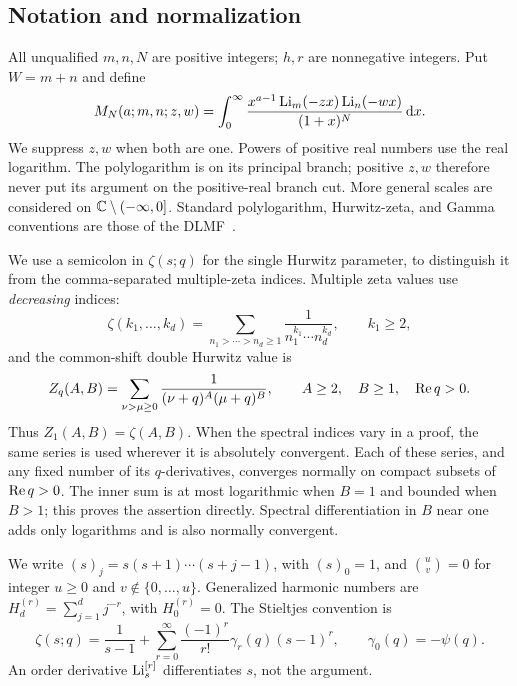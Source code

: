 \subsection{Notation and normalization}
All unqualified $m,n,N$ are positive integers; $h,r$ are nonnegative
integers. Put $W=m+n$ and define
\begin{equation}\label{bmh:eq:M-definition}
 M_N(a;m,n;z,w)=\int_0^\infty
 \frac{x^{a-1}\operatorname{Li}_m(-zx)\operatorname{Li}_n(-wx)}{(1+x)^N}\,\mathrm d x.
\end{equation}
We suppress $z,w$ when both are one. Powers of positive real numbers use
the real logarithm. The polylogarithm is on its principal branch; positive
$z,w$ therefore never put its argument on the positive-real branch cut.
More general scales are considered on
$\mathbb C\setminus(-\infty,0]$. Standard polylogarithm, Hurwitz-zeta, and Gamma
conventions are those of the DLMF~\cite{DLMFpoly,DLMFhurwitz,DLMFbeta}.

We use a semicolon in $\zeta(s;q)$ for the single Hurwitz parameter,
to distinguish it from the comma-separated multiple-zeta indices.
Multiple zeta values use \emph{decreasing} indices:
\begin{equation}\label{bmh:eq:MZV}
 \zeta(k_1,\ldots,k_d)=
 \sum_{n_1>\cdots>n_d\ge1}\frac1{n_1^{k_1}\cdots n_d^{k_d}},
 \qquad k_1\ge2,
\end{equation}
and the common-shift double Hurwitz value is
\begin{equation}\label{bmh:eq:Zq}
 Z_q(A,B)=\sum_{\nu>\mu\ge0}
 \frac1{(\nu+q)^A(\mu+q)^B},
 \qquad A\ge2,
 \quad B\ge1,\quad \operatorname{Re} q>0.
\end{equation}
Thus $Z_1(A,B)=\zeta(A,B)$. When the spectral indices vary in a
proof, the same series is used wherever it is absolutely convergent. Each of these series, and any fixed number of
its $q$-derivatives, converges normally on compact subsets of
$\operatorname{Re} q>0$. The inner sum is at most logarithmic when $B=1$ and bounded
when $B>1$; this proves the assertion directly. Spectral differentiation
in $B$ near one adds only logarithms and is also normally convergent.

We write $(s)_j=s(s+1)\cdots(s+j-1)$, with $(s)_0=1$, and
$\binom uv=0$ for integer $u\ge0$ and $v\notin\{0,\ldots,u\}$.
Generalized harmonic numbers are
$H_d^{(r)}=\sum_{j=1}^d j^{-r}$, with $H_0^{(r)}=0$.
The Stieltjes convention is
\begin{equation}\label{bmh:eq:Stieltjes-convention}
 \zeta(s;q)=\frac1{s-1}
 +\sum_{r=0}^\infty\frac{(-1)^r}{r!}\gamma_r(q)(s-1)^r,
 \qquad \gamma_0(q)=-\psi(q).
\end{equation}
An order derivative $\operatorname{Li}_s^{[r]}$ differentiates $s$, not the argument.

